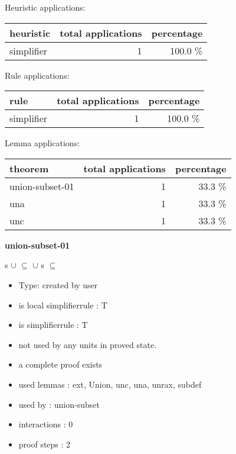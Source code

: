 \documentclass[a4paper]{article}
\begin{document}
\medskip


Heuristic applications:

\begin{supertabular}{l|r|r}
heuristic	& total applications & percentage \\ \hline
simplifier & 1 & 100.0 \% \\

\end{supertabular}

Rule applications:

\begin{supertabular}{l|r|r}
rule	        & total applications & percentage \\ \hline
simplifier & 1 & 100.0 \% \\

\end{supertabular}

Lemma applications:

\begin{supertabular}{l|r|r}
theorem	        & total applications & percentage \\ \hline
union-subset-01 & 1 & 33.3 \% \\
una & 1 & 33.3 \% \\
unc & 1 & 33.3 \% \\

\end{supertabular}
\pagebreak

{\LARGE\bf union-subset-01}\label{lemma-union-subset-01}

\medskip

 \Fol \Not s $\cup$  $\subseteq$  $\cup$  \Imp \Not s $\subseteq$ 

\begin{itemize}

\item Type: created by user

\item is local simplifierrule : T
\item is simplifierrule : T
\item not used by any units in proved state.
\item       a complete proof exists
\item       used lemmas  : ext, Union, unc, una, unrax, subdef
\item       used by      : union-subset
\item       interactions : 0
\item       proof steps  : 2
\end{itemize}
\end{document}
